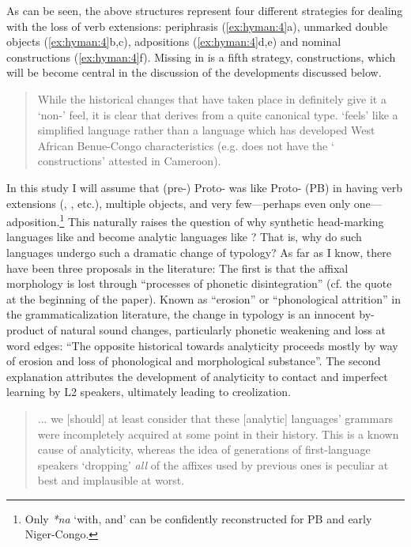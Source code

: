\documentclass[output=paper]{langsci/langscibook}
\begin{document}
As can be seen, the above structures represent four different strategies for dealing with the loss of verb extensions: periphrasis (\ref{ex:hyman:4}a), unmarked double objects (\ref{ex:hyman:4}b,c), adpositions (\ref{ex:hyman:4}d,e) and nominal constructions (\ref{ex:hyman:4}f). Missing in  is a fifth strategy,  constructions, which will be become central in the discussion of the  developments discussed below.

\begin{quote}
While the historical changes that have taken place in  definitely give it a ‘non-’ feel, it is clear that  derives from a quite canonical  type.  ‘feels’ like a simplified  language rather than a  language which has developed West African Benue-Congo characteristics (e.g.  does not have the ‘ constructions’ attested in Cameroon). \citep[3--4]{CraneEtAl2011}
\end{quote}

\noindent 
In this study I will assume that (pre-) Proto- was like Proto- (PB) in having verb extensions (, , etc.), multiple objects, and very few—perhaps even only one—adposition.\footnote{Only \textit{*na} ‘with, and’ can be confidently reconstructed for PB and early Niger-Congo.} This naturally raises the question of why synthetic head-marking languages like  and  become analytic languages like ? That is, why do such languages undergo such a dramatic change of typology? As far as I know, there have been three proposals in the literature:
The first is that the affixal morphology is lost through “processes of phonetic disintegration” (cf. the \citealt{Sapir1933[1949]} quote at the beginning of the paper). Known as “erosion” \citep[21--28]{HeineReh1984} or “phonological attrition” \citep[4]{Lehmann1985} in the grammaticalization literature, the change in typology is an innocent by-product of natural sound changes, particularly phonetic weakening and loss at word edges:
“The opposite historical  towards analyticity proceeds mostly by way of erosion and loss of phonological and morphological substance”. \citep[129]{Güldemann2011}
  The second explanation attributes the development of analyticity to contact and imperfect learning by L2 speakers, ultimately leading to creolization.

\begin{quote}
 ... we [should] at least consider that these [analytic] languages’ grammars were incompletely acquired at some point in their history. This is a known cause of analyticity, whereas the idea of generations of first-language speakers ‘dropping’ \textit{all} of the affixes used by previous ones is peculiar at best and implausible at worst. \citep[226]{McWhorter2011}
\end{quote}
\end{document}
